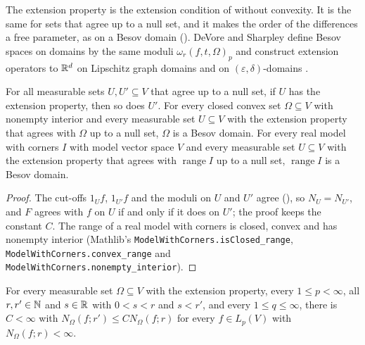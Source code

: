 The extension property is the extension condition of  without convexity.
It is the same for sets that agree up to a null set, and it makes the order of the differences a
free parameter, as on a Besov domain (). DeVore and Sharpley
define Besov spaces on domains by the same moduli $\omega_r(f, t, \Omega)_p$ and construct
extension operators to $\mathbb{R}^d$ on Lipschitz graph domains \cite[Section~4]{DeVoreSharpley} and on
$(\varepsilon, \delta)$-domains \cite[Section~5]{DeVoreSharpley}.

\begin{lemma}
\label{lem:besov-extension-null-sets}
\leanok
{}
For all measurable sets $U, U' \subseteq V$ that agree up to a null set, if $U$ has the extension
property, then so does $U'$. For every closed convex set $\Omega \subseteq V$ with nonempty
interior and every measurable set $U \subseteq V$ with the extension property that agrees with
$\Omega$ up to a null set, $\Omega$ is a Besov domain. For
every real model with corners $I$ with model vector space $V$ and every measurable set
$U \subseteq V$ with the extension property that agrees with $\operatorname{range} I$ up to a null
set, $\operatorname{range} I$ is a Besov domain.
\end{lemma}

\begin{proof}
\leanok
The cut-offs $1_U f$, $1_{U'} f$ and the moduli on $U$ and $U'$ agree (),
so $N_U = N_{U'}$, and $F$ agrees with $f$ on $U$ if and only if it does on $U'$; the proof keeps
the constant $C$. The range of a real model with corners is closed, convex and has nonempty
interior (Mathlib's
\texttt{ModelWithCorners.\allowbreak isClosed\_\allowbreak range},
\texttt{ModelWithCorners.\allowbreak convex\_\allowbreak range} and
\texttt{ModelWithCorners.\allowbreak nonempty\_\allowbreak interior}).
\end{proof}

\begin{corollary}
\label{cor:besov-extension-order}
\leanok
{}
For every measurable set $\Omega \subseteq V$ with the extension property, every
$1 \leq p < \infty$, all $r, r' \in \mathbb{N}$ and $s \in \mathbb{R}$ with $0 < s < r$ and $s < r'$, and every
$1 \leq q \leq \infty$, there is $C < \infty$ with $N_\Omega(f; r') \leq C N_\Omega(f; r)$ for every
$f \in L_p(V)$ with $N_\Omega(f; r) < \infty$.
\end{corollary}

